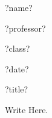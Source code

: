 \documentclass[12pt,letterpaper]{article}
\begin{document}
\noindent %
?name?

\noindent
?professor?

\noindent
?class?

\noindent
?date?

\centerline{?title?}

Write Here.

\end{document}
